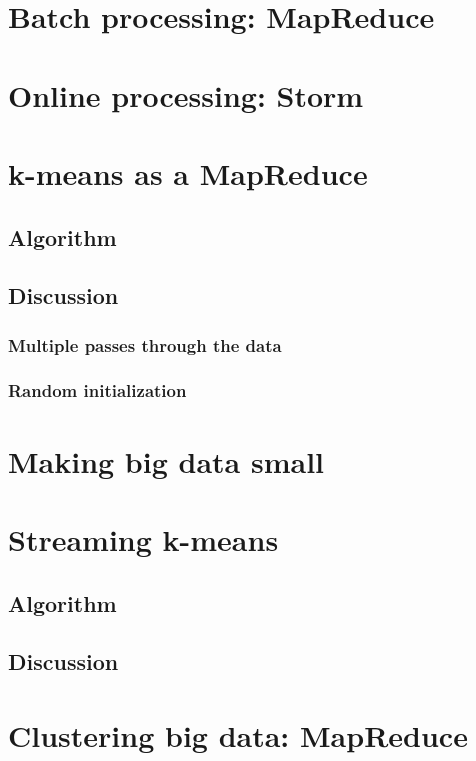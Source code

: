 \documentclass{article}
\begin{document}
\section{Batch processing: MapReduce}

\section{Online processing: Storm}

\section{k-means as a MapReduce}

\subsection{Algorithm}

\subsection{Discussion}

\subsubsection{Multiple passes through the data}

\subsubsection{Random initialization}

\section{Making big data small}

\section{Streaming k-means}

\subsection{Algorithm}

\subsection{Discussion}

\section{Clustering big data: MapReduce}
\end{document}
